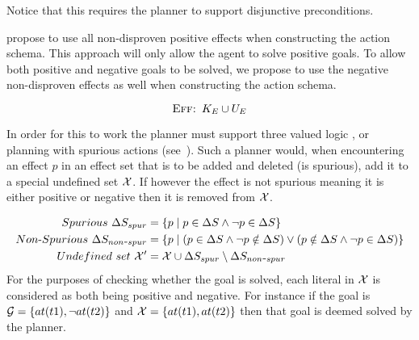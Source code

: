 \documentclass[\master/Master.tex]{subfiles}
\begin{document}
	Notice that this requires the planner to support disjunctive preconditions.

	\cite{Walsh2008} propose to use all non-disproven positive effects when constructing the action schema. 
	This approach will only allow the agent to solve positive goals.
	To allow both positive and negative goals to be solved, we propose to use the negative non-disproven effects as well when constructing the action schema.

	\begin{equation}
        \textsc{Eff: }  K_E \cup U_E
	\end{equation}

    In order for this to work the planner must support three valued logic \cite{putnam1957a}, or planning with spurious actions (see~\cite{Russell}).
	Such a planner would, when encountering an effect $p$ in an effect set \geffects that is to be added and deleted (is spurious), add it to a special undefined set $\mathcal{X}$.
	If however the effect is not spurious meaning it is either positive or negative then it is removed from $\mathcal{X}$.

			\begin{equation}
				\begin{split}
					Spurious~\Delta S_{spur} &= \{ p \mid p \in \Delta S \land \neg p \in \Delta S \} \\
					Non\text{-}Spurious~\Delta S_{non\texttt{-}spur} &= \{ p \mid (p \in \Delta S \land \neg p \notin \Delta S ) \lor (p \notin \Delta S \land \neg p \in \Delta S )  \}\\
					Undefined~set~\mathcal{X}' &= \mathcal{X} \cup \Delta S_{spur} \setminus \Delta S_{non\texttt{-}spur}
				\end{split}
			\end{equation}
	For the purposes of checking whether the goal is solved, each literal in $\mathcal{X}$ is considered as both being positive and negative.
	For instance if the goal is $\mathcal{G} = \{at(t1), \neg at(t2)\}$ and $\mathcal{X} = \{at(t1), at(t2)\}$ then that goal is deemed solved by the planner.
\end{document}
